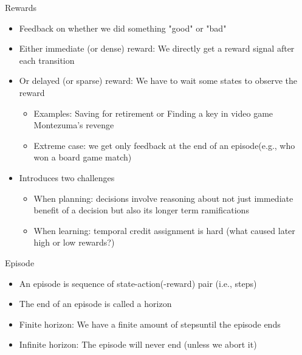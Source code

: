 \begin{frame}[c]{Rewards}
	\begin{itemize}
		\item Feedback on whether we did something "good" or "bad"
		\smallskip
		\pause
		\item Either immediate (or dense) reward: We directly get a reward signal after each transition
		\item Or delayed (or sparse) reward: We have to wait some states to observe the reward
		\begin{itemize}
			\item Examples: Saving for retirement or Finding a key in video game Montezuma’s revenge
			\item Extreme case: we get only feedback at the end of an episode\newline (e.g., who won a board game match)
		\end{itemize}
		\item Introduces two challenges
		\begin{itemize}
			\item When planning: decisions involve reasoning about not just immediate
			benefit of a decision but also its longer term ramifications
			\item When learning: temporal credit assignment is hard (what caused later
			high or low rewards?)
		\end{itemize}
	\end{itemize}
\end{frame}
\begin{frame}[c]{Episode}
	\begin{itemize}
		\item An episode is sequence of state-action(-reward) pair (i.e., steps)
		\item The end of an episode is called a horizon
		\smallskip
		\pause
		\item Finite horizon: We have a finite amount of steps\newline until the episode ends
		\item Infinite horizon: The episode will never end (unless we abort it)
	\end{itemize}
\end{frame}

